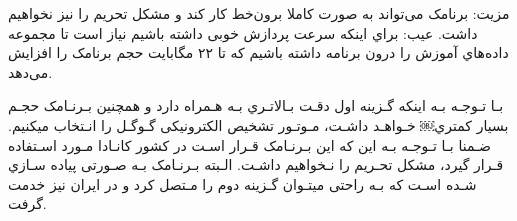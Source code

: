 
مزیت: برنامک می‌تواند به صورت کاملا برون‌خط کار کند و مشکل تحریم را نیز
نخواهیم داشت. 
عیب: براي اینکه سرعت پردازش خوبی داشته باشیم نیاز است تا مجموعه داده‌هاي
آموزش را درون برنامه داشته باشیم که تا ۲۲ مگابایت حجم برنامک را افزایش می‌دهد. 





بـا تـوجـه بـه اینکه گـزینه اول دقـت بـالاتـري بـه هـمراه دارد و همچنین بـرنـامک حجـم بسیار کمتري￼ خـواهـد داشـت، مـوتـور تشخیص الکترونیکی گـوگـل را انـتخاب میکنیم. ضـمنا بـا تـوجـه بـه این که این بـرنـامک قـرار اسـت در کشور کانـادا مـورد اسـتفاده قـرار گیرد، مشکل تحـریم را نـخواهیم داشـت. الـبته بـرنـامک بـه صـورتی پیاده سـازي شـده اسـت که بـه راحتی میتـوان گـزینه دوم را مـتصل کرد و در ایران نیز خدمت گرفت.
